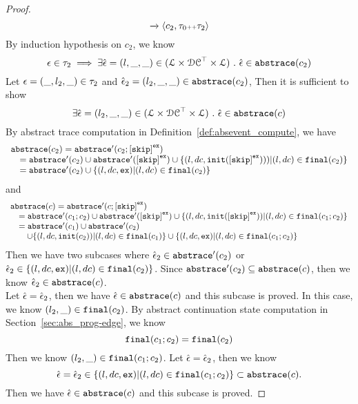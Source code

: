 \begin{proof}
\[{      \xrightarrow{} 
      \langle {c_2, \ensuremath{\mathtt{\tau}}_0 {\scriptscriptstyle ++}\ensuremath{\mathtt{\tau}}_2} \rangle
      }
    \]
    By induction hypothesis on $c_2$, we know 
    \[
      \mathtt{\epsilon} \in \mathtt{\tau}_2
      \implies
      \exists \hat{\mathtt{\epsilon}{}} = (l, \_, \_) \in (\mathcal{L} \times \mathcal{DC}^{\top} \times \mathcal{L}) ~.~ 
      \hat{\mathtt{\epsilon}{}} \in \mathtt{abs}{\mathtt{trace}}(c_2)
    \]
    Let $\mathtt{\epsilon} = (\_, l_2, \_) \in \mathtt{\tau}_2$ and $\hat{\mathtt{\epsilon}{}}_2 = (l_2, \_, \_) \in \mathtt{abs}{\mathtt{trace}}(c_2)$,
    Then it is sufficient to show
    \[
      \exists \hat{\mathtt{\epsilon}{}} = (l_2, \_, \_) \in (\mathcal{L} \times \mathcal{DC}^{\top} \times \mathcal{L}) ~.~ 
      \hat{\mathtt{\epsilon}{}} \in \mathtt{abs}{\mathtt{trace}}(c)
    \]
    By abstract trace computation in Definition~\ref{def:absevent_compute}, we have
    \[
      \begin{array}{l}
        \absflow(c_2) = \absflow'(c_2; \clabel{\eskip}^{\lex}) 
        \\ \quad
        = \absflow'(c_2) \cup \absflow'(\clabel{\eskip}^{\lex}) 
        \cup \{ (l, dc, \absinit(\clabel{\eskip}^{\lex}))) | (l, dc) \in \absfinal(c_2) \} 
        \\ \quad
        = \absflow'(c_2) \cup  \{ (l, dc, \lex) | (l, dc) \in \absfinal(c_2) \} 
     \end{array}
    \]  
    and 
    \[
      \begin{array}{l}
        \absflow(c) = \absflow'(c; \clabel{\eskip}^{\lex}) 
        \\ \quad
        = \absflow'(c_1;c_2) \cup \absflow'(\clabel{\eskip}^{\lex}) 
        \cup \{ (l, dc, \absinit(\clabel{\eskip}^{\lex})) | (l, dc) \in \absfinal(c_1; c_2) \} 
        \\ \quad  
        = \absflow'(c_1) \cup \absflow'(c_2) 
        \\ \quad \quad
        \cup \{ (l, dc, \absinit(c_2)) | (l, dc) \in \absfinal(c_1) \} 
        \cup \{ (l, dc, \lex) | (l, dc) \in \absfinal(c_1; c_2) \} 
     \end{array}
    \]
    Then we have two subcases where 
    $\hat{\mathtt{\epsilon}{}}_2 \in \mathtt{abs}{\mathtt{trace}}'(c_2)$ or $\hat{\mathtt{\epsilon}{}}_2 \in \{ (l, dc, \mathtt{ex}) | (l, dc) \in \mathtt{final}(c_2) \}$.
    Since $\mathtt{abs}{\mathtt{trace}}'(c_2) \subseteq \mathtt{abs}{\mathtt{trace}}(c)$, then we know $\hat{\mathtt{\epsilon}{}}_2 \in \mathtt{abs}{\mathtt{trace}}(c)$.
    \\
    Let $\hat{\mathtt{\epsilon}{}} = \hat{\mathtt{\epsilon}{}}_2$, then we have $\hat{\mathtt{\epsilon}{}} \in \mathtt{abs}{\mathtt{trace}}(c)$ and this subcase is proved.
    In this case, we know $(l_2, \_) \in \mathtt{final}(c_2)$. By abstract continuation state computation in Section~\ref{sec:abs_prog-edge}, we know
    \[
      \mathtt{final}(c_1; c_2) =  \mathtt{final}(c_2) 
    \]
    Then we know $(l_2, \_) \in \mathtt{final}(c_1; c_2)$. Let $\hat{\mathtt{\epsilon}{}} = \hat{\mathtt{\epsilon}{}}_2$, then we know 
    \[
      \hat{\mathtt{\epsilon}{}} = \hat{\mathtt{\epsilon}{}}_2 \in   \{ (l, dc, \mathtt{ex}) | (l, dc) \in \mathtt{final}(c_1; c_2) \}  \subset\mathtt{abs}{\mathtt{trace}}(c).
    \]
    Then we have $\hat{\mathtt{\epsilon}{}} \in \mathtt{abs}{\mathtt{trace}}(c)$ and this subcase is proved.
  \end{proof}
  
